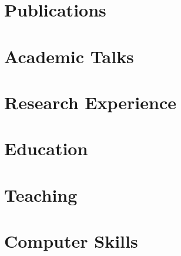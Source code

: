 \documentclass[letter,10pt]{article}
\begin{document}


\section{Publications}


\section{Academic Talks}


\section{Research Experience}


\section{Education}


\section{Teaching}


\section{Computer Skills}


%
\end{document}
